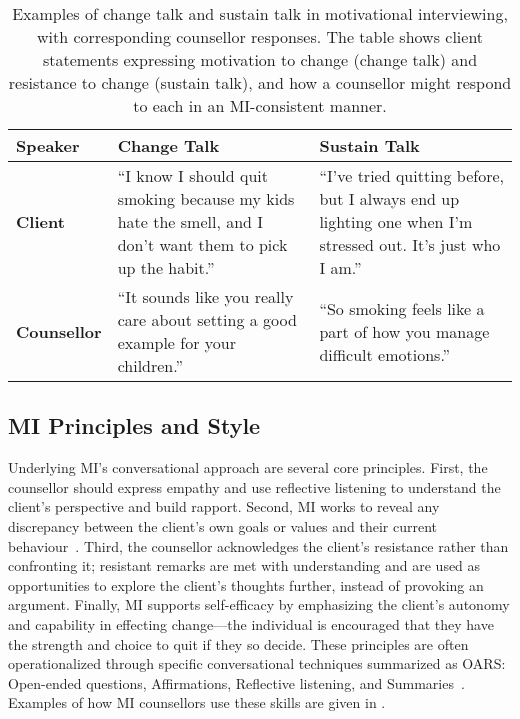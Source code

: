 \begin{table}[ht!]
	\centering
	\begin{tabular}{@{} p{} p{} p{} @{}}
		\toprule
		\textbf{Speaker}                                                                                             & \textbf{Change Talk} & \textbf{Sustain Talk} \\
		\midrule
		\textbf{Client}                                                                                              &
		``I know I should quit smoking because my kids hate the smell, and I don’t want them to pick up the habit.'' &
		``I’ve tried quitting before, but I always end up lighting one when I’m stressed out. It’s just who I am.''                                                 \\
		\addlinespace
		\textbf{Counsellor}                                                                                          &
		``It sounds like you really care about setting a good example for your children.''                           &
		``So smoking feels like a part of how you manage difficult emotions.''                                                                                      \\
		\bottomrule
	\end{tabular}
	\caption[Examples of change talk and sustain talk]{Examples of change talk and sustain talk in motivational interviewing, with corresponding counsellor responses. The table shows client statements expressing motivation to change (change talk) and resistance to change (sustain talk), and how a counsellor might respond to each in an MI-consistent manner.}
	\label{tab:change_sustain_talk}
\end{table}



\subsection*{MI Principles and Style}
Underlying MI's conversational approach are several core principles. First, the counsellor should express empathy and use reflective listening to understand the client's perspective and build rapport. Second, MI works to reveal any discrepancy between the client's own goals or values and their current behaviour~\cite{Miller_2023}. Third, the counsellor acknowledges the client's resistance rather than confronting it; resistant remarks are met with understanding and are used as opportunities to explore the client's thoughts further, instead of provoking an argument. Finally, MI supports self-efficacy by emphasizing the client's autonomy and capability in effecting change---the individual is encouraged that they have the strength and choice to quit if they so decide. These principles are often operationalized through specific conversational techniques summarized as OARS: Open-ended questions, Affirmations, Reflective listening, and Summaries~\cite{Rollnick1995}. Examples of how MI counsellors use these skills are given in .



